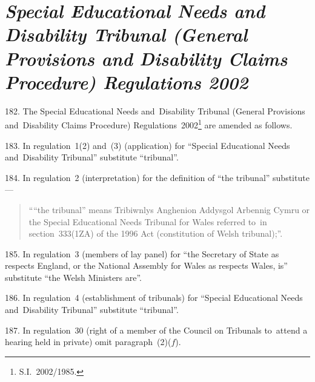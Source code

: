 \documentclass[12pt,a4paper]{article}
\begin{document}
\section*{\itshape\sloppy{} Special Educational Needs and Disability Tribunal (General Provisions and Disability Claims Procedure) Regulations 2002}

182.  The Special Educational Needs and~Disability Tribunal (General Provisions and~Disability Claims Procedure) Regulations~2002\footnote{S.I.~2002/1985.} are amended as follows.

\medskip

183.  In regulation~1(2) and~(3) (application) for “Special Educational Needs and~Disability Tribunal” substitute “tribunal”.

\medskip

184.  In regulation~2 (interpretation) for the definition of “the tribunal” substitute—
\begin{quotation}
““the tribunal” means {Tribiwnlys Anghenion Addysgol Arbennig Cymru} or the Special Educational Needs Tribunal for Wales referred to~in section~333(1ZA) of the 1996 Act (constitution of Welsh tribunal);”.
\end{quotation}

\medskip

185.  In regulation~3 (members of lay panel) for “the Secretary of State as respects England, or the National Assembly for Wales as respects Wales, is” substitute “the Welsh Ministers are”.

\medskip

186.  In regulation~4 (establishment of tribunals) for “Special Educational Needs and~Disability Tribunal” substitute “tribunal”.

\medskip

187.  In regulation~30 (right of a member of the Council on Tribunals to~attend a hearing held in private) omit paragraph~(2)($f$).

\medskip
\end{document}
